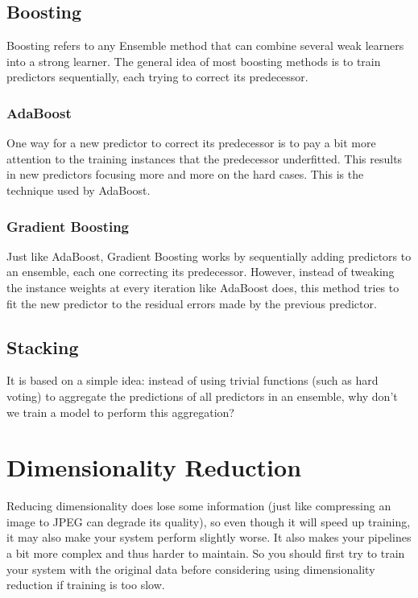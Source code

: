 \documentclass[french]{article}
\begin{document}
\subsection{Boosting}

Boosting refers to any Ensemble method that can combine several weak learners into a strong learner. The general idea of most boosting methods is to train predictors sequentially, each trying to correct its predecessor.

\subsubsection{AdaBoost}

One way for a new predictor to correct its predecessor is to pay a bit more attention to the training instances that the predecessor underfitted. This results in new predictors focusing more and more on the hard cases. This is the technique used by AdaBoost.

\subsubsection{Gradient Boosting}

Just like AdaBoost, Gradient Boosting works by sequentially adding predictors to an ensemble, each one correcting its predecessor. However, instead of tweaking the instance weights at every iteration like AdaBoost does, this method tries to fit the new predictor to the residual errors made by the previous predictor.

\subsection{Stacking}

It is based on a simple idea: instead of using trivial functions (such as hard voting) to aggregate the predictions of all predictors in an ensemble, why don’t we train a model to perform this aggregation?

\section{Dimensionality Reduction}

Reducing dimensionality does lose some information (just like compressing an image to JPEG can degrade its quality), so even though it will speed up training, it may also make your system perform slightly worse. It also makes your pipelines a bit more complex and thus harder to maintain. So you should first try to train your system with the original data before considering using dimensionality reduction if training is too slow.
\end{document}
